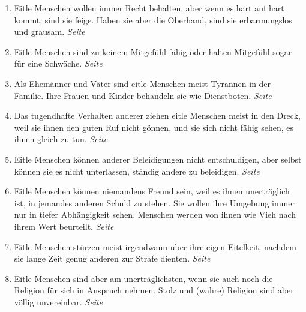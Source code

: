 \begin{enumerate}
\begin{enumerate}
 \item Eitle Menschen wollen immer Recht behalten, aber wenn es hart auf hart
kommt, sind sie feige. Haben sie aber die Oberhand, sind sie erbarmungslos und
grausam.
 \dotfill \textit{Seite~\pageref{ref:12_02_eitle_menschen_streit}}\\

 \item Eitle Menschen sind zu keinem Mitgefühl fähig oder halten Mitgefühl sogar
für eine Schwäche.
 \dotfill \textit{Seite~\pageref{ref:12_02_eitle_menschen_mitgefuehl}}\\

 \item Als Ehemänner und Väter sind eitle Menschen meist Tyrannen in der
Familie. Ihre Frauen und Kinder behandeln sie wie Dienstboten.
 \dotfill \textit{Seite~\pageref{ref:12_03_eitle_menschen_ehe}}\\

 \item Das tugendhafte Verhalten anderer ziehen eitle Menschen meist in den Dreck,
weil sie ihnen den guten Ruf nicht gönnen, und sie sich nicht fähig sehen, es
ihnen gleich zu tun.
 \dotfill \textit{Seite~\pageref{ref:12_04_eitle_menschen_tugent}}\\

 \item Eitle Menschen können anderer Beleidigungen nicht entschuldigen, aber
selbst können sie es nicht unterlassen, ständig andere zu beleidigen.
 \dotfill \textit{Seite~\pageref{ref:12_04_eitle_menschen_beleidigung}}\\

 \item Eitle Menschen können niemandens Freund sein, weil es ihnen unerträglich
ist, in jemandes anderen Schuld zu stehen. Sie wollen ihre Umgebung immer nur in
tiefer Abhängigkeit sehen. Menschen werden von ihnen wie Vieh nach ihrem Wert
beurteilt.
 \dotfill \textit{Seite~\pageref{ref:12_05_eitle_menschen_freundschaft}}\\

 \item Eitle Menschen stürzen meist irgendwann über ihre eigen Eitelkeit,
nachdem sie lange Zeit genug anderen zur Strafe dienten.
 \dotfill \textit{Seite~\pageref{ref:12_06_eitle_menschen_sturz}}\\

 \item Eitle Menschen sind aber am unerträglichsten, wenn sie auch noch die
Religion für sich in Anspruch nehmen. Stolz und (wahre) Religion sind aber
völlig unvereinbar.
 \dotfill \textit{Seite~\pageref{ref:12_07_eitle_menschen_religion}}\\


\end{enumerate}
\end{enumerate}
